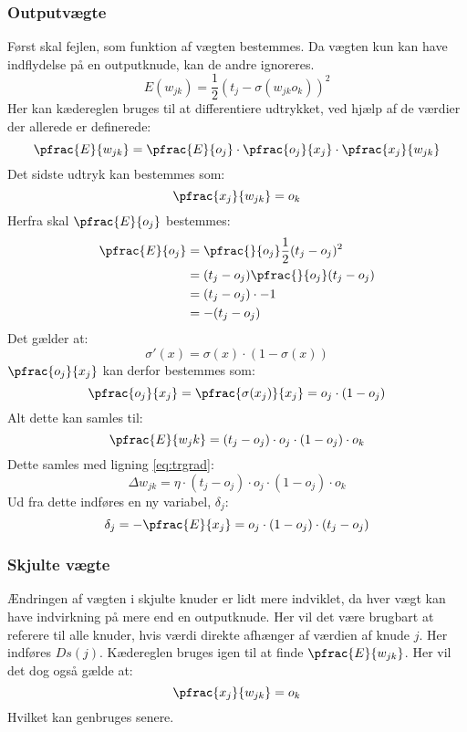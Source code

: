\documentclass[../SOP.tex]{subfile}
\begin{document}
\subsubsection{Outputvægte}
Først skal fejlen, som funktion af vægten bestemmes. Da vægten kun kan have indflydelse på en outputknude, kan de andre ignoreres.
\begin{equation*}
  E(w_{jk})=\frac{1}{2}(t_j-\sigma(w_{jk}o_k))^2
\end{equation*}
Her kan kædereglen bruges til at differentiere udtrykket, ved hjælp af de værdier der allerede er definerede:
\begin{equation*}
  \pfrac{E}{w_{jk}}=\pfrac{E}{o_j}\cdot\pfrac{o_j}{x_j}\cdot\pfrac{x_j}{w_{jk}}
\end{equation*}
Det sidste udtryk kan bestemmes som:
\begin{equation*}
  \pfrac{x_j}{w_{jk}}=o_k
\end{equation*}
Herfra skal $\pfrac{E}{o_j}$ bestemmes:
\begin{align*}
  \pfrac{E}{o_j}&=\pfrac{}{o_j}\frac{1}{2}(t_j-o_j)^2\\
  &= (t_j-o_j)\pfrac{}{o_j}(t_j-o_j)\\
  &= (t_j-o_j)\cdot-1\\
  &= -(t_j-o_j)
\end{align*}
Det gælder at:
\begin{equation*}
  \sigma'(x)=\sigma(x)\cdot(1-\sigma(x))
\end{equation*}
$\pfrac{o_j}{x_j}$ kan derfor bestemmes som:
\begin{equation*}
  \pfrac{o_j}{x_j}=\pfrac{\sigma(x_j)}{x_j}=o_j\cdot(1-o_j)
\end{equation*}
Alt dette kan samles til:
\begin{equation}
  \pfrac{E}{w_jk}=(t_j-o_j)\cdot o_j \cdot (1-o_j)\cdot o_k
  \label{eq:errorWeight}
\end{equation}
Dette samles med ligning \ref{eq:trgrad}:
\begin{equation}
  \Delta w_{jk}=\eta\cdot (t_j-o_j)\cdot o_j\cdot(1-o_j)\cdot o_k
  \label{eq:trOutput}
\end{equation}
Ud fra dette indføres en ny variabel, $\delta_j$:
\begin{equation}
  \delta_j =-\pfrac{E}{x_j}=o_j\cdot(1-o_j)\cdot(t_j-o_j)
  \label{eq:delta}
\end{equation}

\subsubsection{Skjulte vægte}
Ændringen af vægten i skjulte knuder er lidt mere indviklet, da hver vægt kan have indvirkning på mere end en outputknude. Her vil det være brugbart at referere til alle knuder, hvis værdi direkte afhænger af værdien af knude $j$. Her indføres $Ds(j)$. Kædereglen bruges igen til at finde $\pfrac{E}{w_{jk}}$. Her vil det dog også gælde at:
\begin{equation*}
  \pfrac{x_j}{w_{jk}}=o_k
\end{equation*}
Hvilket kan genbruges senere.\\
\end{document}

